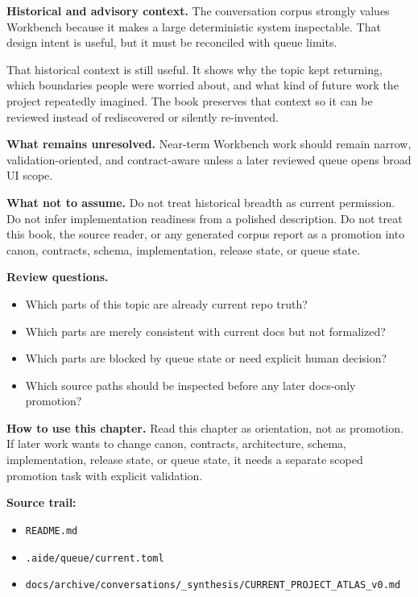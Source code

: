 \documentclass[10.5pt,a4paper,openany]{book}
\begin{document}
\textbf{Historical and advisory context.} The conversation corpus strongly values Workbench because it makes a large deterministic system inspectable.\allowbreak{} That design intent is useful, but it must be reconciled with queue limits.\allowbreak{}


That historical context is still useful.\allowbreak{} It shows why the topic kept returning, which boundaries people were worried about, and what kind of future work the project repeatedly imagined.\allowbreak{} The book preserves that context so it can be reviewed instead of rediscovered or silently re-\allowbreak{}invented.\allowbreak{}


\textbf{What remains unresolved.} Near-\allowbreak{}term Workbench work should remain narrow, validation-\allowbreak{}oriented, and contract-\allowbreak{}aware unless a later reviewed queue opens broad UI scope.\allowbreak{}


\textbf{What not to assume.} Do not treat historical breadth as current permission.\allowbreak{} Do not infer implementation readiness from a polished description.\allowbreak{} Do not treat this book, the source reader, or any generated corpus report as a promotion into canon, contracts, schema, implementation, release state, or queue state.\allowbreak{}


\textbf{Review questions.}


\begin{itemize}
\item Which parts of this topic are already current repo truth?
\item Which parts are merely consistent with current docs but not formalized?
\item Which parts are blocked by queue state or need explicit human decision?
\item Which source paths should be inspected before any later docs-\allowbreak{}only promotion?
\end{itemize}

\textbf{How to use this chapter.} Read this chapter as orientation, not as promotion.\allowbreak{} If later work wants to change canon, contracts, architecture, schema, implementation, release state, or queue state, it needs a separate scoped promotion task with explicit validation.\allowbreak{}


\textbf{Source trail:}


\begin{itemize}
\item \texttt{README.\allowbreak{}md}
\item \texttt{.\allowbreak{}aide/\allowbreak{}queue/\allowbreak{}current.\allowbreak{}toml}
\item \texttt{docs/\allowbreak{}archive/\allowbreak{}conversations/\allowbreak{}\_\allowbreak{}synthesis/\allowbreak{}CURRENT\_\allowbreak{}PROJECT\_\allowbreak{}ATLAS\_\allowbreak{}v0.\allowbreak{}md}
\end{itemize}
\end{document}
